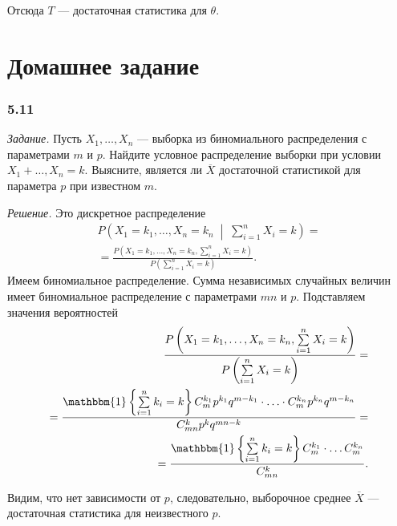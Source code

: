 Отсюда $T$ --- достаточная статистика для $ \theta $.

\section*{Домашнее задание}

\subsubsection*{5.11}

\textit{Задание.}
Пусть $X_1, \dotsc, X_n$ --- выборка из биномиального распределения с параметрами $m$ и $p$.
Найдите условное распределение выборки при условии $X_1 + \dotsc, X_n = k$.
Выясните, является ли $ \overline{X}$ достаточной статистикой для параметра $p$ при известном $m$.

\textit{Решение.} Это дискретное распределение
\begin{equation*}
  \begin{split}
    P \left( X_1 = k_1, \dotsc, X_n = k_n \; \middle| \; \sum \limits_{i = 1}^n X_i = k \right) = \\
    = \frac{P \left( X_1 = k_1, \dotsc, X_n = k_n, \sum \limits_{i = 1}^n X_i = k \right) }{P \left( \sum \limits_{i = 1}^n X_i = k \right) }.
  \end{split}
\end{equation*}
Имеем биномиальное распределение.
Сумма независимых случайных величин имеет биномиальное распределение с параметрами $mn$ и $p$.
Подставляем значения вероятностей
\begin{equation*}
  \begin{split}
    \frac{P \left( X_1 = k_1, \dotsc, X_n = k_n, \sum \limits_{i = 1}^n X_i = k \right) }{P \left( \sum \limits_{i = 1}^n X_i = k \right) } = \\
    = \frac{ \mathbbm{1} \left\{ \sum \limits_{i = 1}^n k_i = k \right\} C_m^{k_1} p^{k_1} q^{m - k_1} \cdot \dotsc \cdot C_m^{k_n} p^{k_n} q^{m - k_n}}{C_{mn}^k p^k q^{mn-k}} = \\
    = \frac{ \mathbbm{1} \left\{ \sum \limits_{i = 1}^n k_i = k \right\} C_m^{k_1} \cdot \dotsc C_m^{k_n}}{C_{mn}^k}.
  \end{split}
\end{equation*}

Видим, что нет зависимости от $p$, следовательно, выборочное среднее $ \overline{X}$ ---
достаточная статистика для неизвестного $p$.

